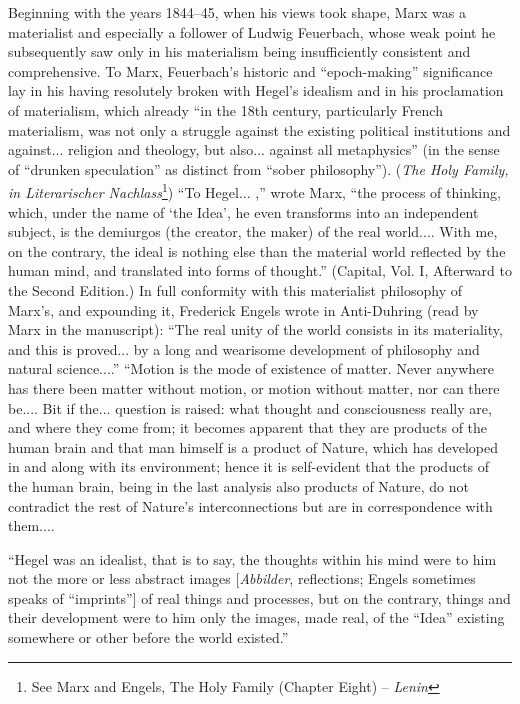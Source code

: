 \documentclass[a4paper,12pt]{book}
\begin{document}
Beginning with the years 1844–45, when his views took shape, Marx was a materialist and especially a follower of Ludwig Feuerbach, whose weak point he subsequently saw only in his materialism being insufficiently consistent and comprehensive. To Marx, Feuerbach’s historic and “epoch-making” significance lay in his having resolutely broken with Hegel’s idealism and in his proclamation of materialism, which already “in the 18th century, particularly French materialism, was not only a struggle against the existing political institutions and against... religion and theology, but also... against all metaphysics” (in the sense of “drunken speculation” as distinct from “sober philosophy”). (\emph{The Holy Family, in Literarischer Nachlass}\footnote{See Marx and Engels, The Holy Family (Chapter Eight) -- \emph{Lenin}}) “To Hegel... ,” wrote Marx, “the process of thinking, which, under the name of ‘the Idea’, he even transforms into an independent subject, is the demiurgos (the creator, the maker) of the real world.... With me, on the contrary, the ideal is nothing else than the material world reflected by the human mind, and translated into forms of thought.” (Capital, Vol. I, Afterward to the Second Edition.) In full conformity with this materialist philosophy of Marx’s, and expounding it, Frederick Engels wrote in Anti-Duhring (read by Marx in the manuscript): “The real unity of the world consists in its materiality, and this is proved... by a long and wearisome development of philosophy and natural science....” “Motion is the mode of existence of matter. Never anywhere has there been matter without motion, or motion without matter, nor can there be.... Bit if the... question is raised: what thought and consciousness really are, and where they come from; it becomes apparent that they are products of the human brain and that man himself is a product of Nature, which has developed in and along with its environment; hence it is self-evident that the products of the human brain, being in the last analysis also products of Nature, do not contradict the rest of Nature’s interconnections but are in correspondence with them....

“Hegel was an idealist, that is to say, the thoughts within his mind were to him not the more or less abstract images [\emph{Abbilder}, reflections; Engels sometimes speaks of “imprints”] of real things and processes, but on the contrary, things and their development were to him only the images, made real, of the “Idea” existing somewhere or other before the world existed.”
\end{document}
